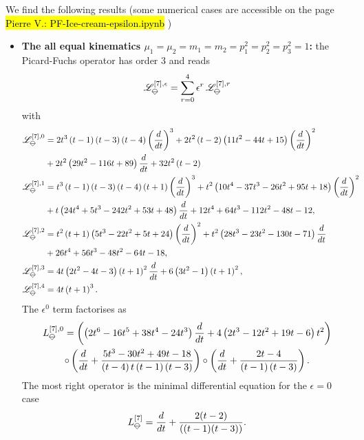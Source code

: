 \documentclass[a4paper,12pt]{article}
\numberwithin{equation}{section}
\numberwithin{figure}{section}
\newcommand{\pvnote}[1]{\sethlcolor{bubblegum} \protect\hl{Pierre V.: #1} \sethlcolor{yellow}}
\newcommand{\IceCream}{	\begin{tikzpicture}[scale=0.05]
	\draw[color = black, fill=none] (2,0) arc(0:180:2);
		\draw [black] (-2,0) to (2,0);
		\draw [black] (-2,0) to (0,-2);
                	\draw [black] (2,0) to (0,-2);
	\end{tikzpicture}}
\begin{document}
We find the following results (some numerical cases are accessible on
the page \pvnote{PF-Ice-cream-epsilon.ipynb})
\begin{itemize}
	\item {\bf The all equal kinematics
		$\mu_1=\mu_2=m_1=m_2=p_1^2=p_2^2=p_3^2=1$:} the Picard-Fuchs operator
	has order 3 and
	reads
	\begin{equation}
		\mathscr{L}_{\IceCream}^{[7],\epsilon}=\sum_{r=0}^4 \epsilon^r\,\mathscr{L}_{\IceCream}^{[7],r}
	\end{equation}
	with
	\begin{align}
		\mathscr{L}_{\IceCream}^{[7],0}&= 2 t^{3} \left(t -1\right)
		\left(t -3\right) \left(t -4\right) \left(d\over dt\right)^{3}+2 t^{2} \left(t
		-2\right) \left(11 t^{2}-44 t +15\right) \left(d\over dt\right)^{2}\cr&+2 t^{2}
		\left(29 t^{2}-116 t +89\right) {d\over dt} +32 t^{2} \left(t
		-2\right)\cr
		\mathscr{L}_{\IceCream}^{[7],1}&=t^{3} \left(t -1\right) \left(t -3\right) \left(t -4\right) \left(t +1\right) \left(d\over dt\right)^{3}+t^{2} \left(10 t^{4}-37 t^{3}-26 t^{2}+95 t +18\right) \left(d\over dt\right)^{2}\cr&+t \left(24 t^{4}+5 t^{3}-242 t^{2}+53 t +48\right)  {d\over dt} +12 t^{4}+64 t^{3}-112 t^{2}-48 t -12,\cr
		\mathscr{L}_{\IceCream}^{[7],2}&=t^{2} \left(t +1\right) \left(5 t^{3}-22 t^{2}+5 t +24\right) \left(d\over dt\right)^{2}+t^{2} \left(28 t^{3}-23 t^{2}-130 t -71\right)  {d\over dt} \cr&+26 t^{4}+56 t^{3}-48 t^{2}-64 t -18,\cr
		\mathscr{L}_{\IceCream}^{[7],3}&=4 t \left(2 t^{2}-4 t -3\right) \left(t +1\right)^{2}
		{d\over dt}+6 \left(3 t^{2}-1\right) \left(t +1\right)^{2},\cr
		\mathscr{L}_{\IceCream}^{[7],4}&= 4 t \left(t +1\right)^{3}.
	\end{align}
	The $\epsilon^0$ term factorises as
	\begin{multline}
		L_{\IceCream}^{[7],0}=\left(
		\left(2 t^{6}-16 t^{5}+38 t^{4}-24 t^{3}\right) {{d\over dt}} +4 \left(2 t^{3}-12 t^{2}+19 t -6\right) t^{2}\right)\cr\circ
		\left(
		{{d\over dt}} +\frac{5 t^{3}-30 t^{2}+49 t -18}{\left(t -4\right) t \left(t -1\right) \left(t -3\right)}
		\right)\circ \left({{d\over dt}} +\frac{2 t -4}{\left(t -1\right) \left(t -3\right)}
		\right).
	\end{multline}
	The most right operator is the minimal differential equation for the
	$\epsilon=0$ case~\cite{Lairez:2022zkj}
	\begin{equation}
		L_{\IceCream}^{[7]}= {d\over dt}+ {2(t - 2)\over ((t - 1)(t - 3))  }.
	\end{equation}
	

\end{itemize}
\end{document}

